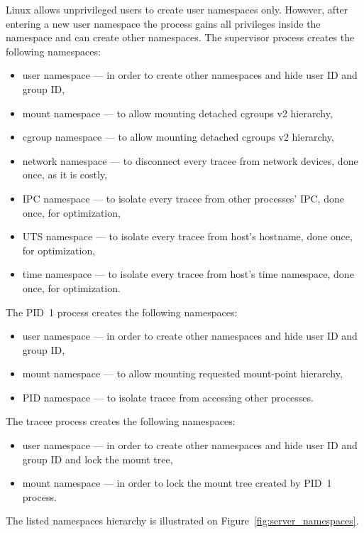\documentclass[en]{pracamgr}
\begin{document}
Linux allows unprivileged users to create user namespaces only. However, after entering a new user namespace the process gains all privileges inside the namespace and can create other namespaces.
\newline
The supervisor process creates the following namespaces:
\begin{itemize}
    \item user namespace --- in order to create other namespaces and hide user ID and group ID,
    \item mount namespace --- to allow mounting detached cgroups v2 hierarchy,
    \item cgroup namespace --- to allow mounting detached cgroups v2 hierarchy,
    \item network namespace --- to disconnect every tracee from network devices, done once, as it is costly,
    \item IPC namespace --- to isolate every tracee from other processes' IPC, done once, for optimization,
    \item UTS namespace --- to isolate every tracee from host's hostname, done once, for optimization,
    \item time namespace --- to isolate every tracee from host's time namespace, done once, for optimization.
\end{itemize}
The PID~1 process creates the following namespaces:
\begin{itemize}
    \item user namespace --- in order to create other namespaces and hide user ID and group ID,
    \item mount namespace --- to allow mounting requested mount-point hierarchy,
    \item PID namespace --- to isolate tracee from accessing other processes.
\end{itemize}
The tracee process creates the following namespaces:
\begin{itemize}
    \item user namespace --- in order to create other namespaces and hide user ID and group ID and lock the mount tree,
    \item mount namespace --- in order to lock the mount tree created by PID~1 process.
\end{itemize}
The listed namespaces hierarchy is illustrated on Figure~\ref{fig:server_namespaces}.
\end{document}
